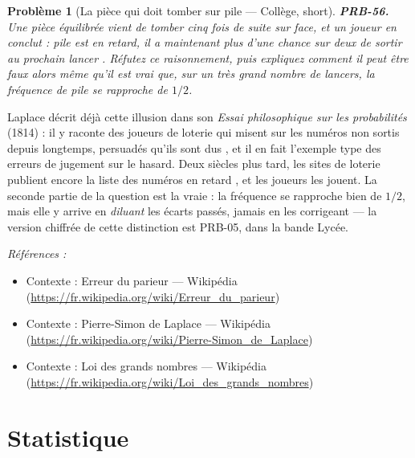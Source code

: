 \documentclass[11pt]{article}
\newtheorem{problem}{Problème}
\newenvironment{refs}{\par\small\noindent\emph{Références :}\begin{itemize}\setlength\itemsep{0pt}}{\end{itemize}\normalsize}
\begin{document}
\bigskip

\begin{problem}[{La pièce qui \og{} doit \fg{} tomber sur pile --- Collège, short}]
\textbf{PRB-56.} Une pièce équilibrée vient de tomber cinq fois de suite sur
face, et un joueur en conclut : \og{} pile est en retard, il a maintenant plus d'une chance sur deux de
sortir au prochain lancer \fg{}. Réfutez ce raisonnement, puis expliquez comment il peut être faux
alors même qu'il est vrai que, sur un très grand nombre de lancers, la fréquence de \og{} pile \fg{} se
rapproche de $ 1/2 $.
\end{problem}

\noindent Laplace décrit déjà cette illusion dans son \textit{Essai philosophique sur les
probabilités} (1814) : il y raconte des joueurs de loterie qui misent sur les numéros non sortis
depuis longtemps, persuadés qu'ils sont \og{} dus \fg{}, et il en fait l'exemple type des erreurs de
jugement sur le hasard. Deux siècles plus tard, les sites de loterie publient encore la liste des
numéros \og{} en retard \fg{}, et les joueurs les jouent. La seconde partie de la question est la vraie :
la fréquence se rapproche bien de $ 1/2 $, mais elle y arrive en \textit{diluant} les écarts
passés, jamais en les corrigeant --- la version chiffrée de cette distinction est PRB-05, dans la
bande Lycée.

\begin{refs}
\item Contexte : Erreur du parieur --- Wikipédia (\url{https://fr.wikipedia.org/wiki/Erreur_du_parieur})
\item Contexte : Pierre-Simon de Laplace --- Wikipédia (\url{https://fr.wikipedia.org/wiki/Pierre-Simon_de_Laplace})
\item Contexte : Loi des grands nombres --- Wikipédia (\url{https://fr.wikipedia.org/wiki/Loi_des_grands_nombres})
\end{refs}

\bigskip


\section*{Statistique}
\end{document}
